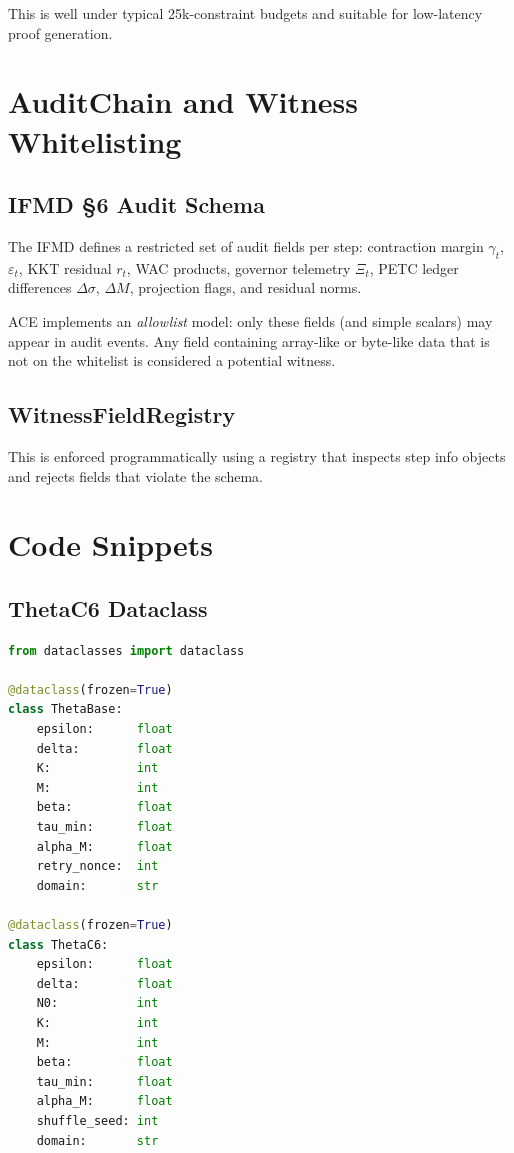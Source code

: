 \documentclass[11pt]{article}
\begin{document}
This is well under typical 25k-constraint budgets and suitable for low-latency proof generation.

\section{AuditChain and Witness Whitelisting}

\subsection{IFMD §6 Audit Schema}

The IFMD defines a restricted set of audit fields per step: contraction margin $\gamma_t$, $\varepsilon_t$, KKT residual $r_t$, WAC products, governor telemetry $\Xi_t$, PETC ledger differences $\Delta \sigma$, $\Delta M$, projection flags, and residual norms.

ACE implements an \emph{allowlist} model: only these fields (and simple scalars) may appear in audit events. Any field containing array-like or byte-like data that is not on the whitelist is considered a potential witness.

\subsection{WitnessFieldRegistry}

This is enforced programmatically using a registry that inspects step info objects and rejects fields that violate the schema.

\section{Code Snippets}

\subsection{ThetaC6 Dataclass}

\begin{lstlisting}[style=code,language=Python,caption={ThetaC6 parameter bundle}]
from dataclasses import dataclass

@dataclass(frozen=True)
class ThetaBase:
    epsilon:      float
    delta:        float
    K:            int
    M:            int
    beta:         float
    tau_min:      float
    alpha_M:      float
    retry_nonce:  int
    domain:       str

@dataclass(frozen=True)
class ThetaC6:
    epsilon:      float
    delta:        float
    N0:           int
    K:            int
    M:            int
    beta:         float
    tau_min:      float
    alpha_M:      float
    shuffle_seed: int
    domain:       str
\end{lstlisting}
\end{document}

